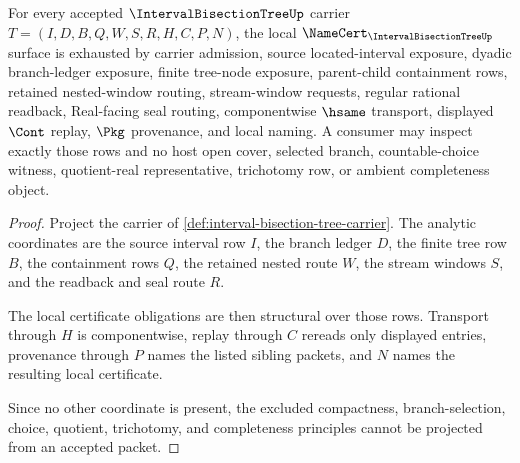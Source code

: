 \begin{theorem}
\label{thm:interval-bisection-tree-namecert-obligations}
For every accepted $\IntervalBisectionTreeUp$ carrier $T=(I,D,B,Q,W,S,R,H,C,P,N)$, the local $\NameCert_{\IntervalBisectionTreeUp}$ surface is exhausted by carrier admission, source located-interval exposure, dyadic branch-ledger exposure, finite tree-node exposure, parent-child containment rows, retained nested-window routing, stream-window requests, regular rational readback, Real-facing seal routing, componentwise $\hsame$ transport, displayed $\Cont$ replay, $\Pkg$ provenance, and local naming. A consumer may inspect exactly those rows and no host open cover, selected branch, countable-choice witness, quotient-real representative, trichotomy row, or ambient completeness object.
\end{theorem}
\begin{proof}
Project the carrier of \autoref{def:interval-bisection-tree-carrier}. The analytic coordinates are the source interval row $I$, the branch ledger $D$, the finite tree row $B$, the containment rows $Q$, the retained nested route $W$, the stream windows $S$, and the readback and seal route $R$.

The local certificate obligations are then structural over those rows. Transport through $H$ is componentwise, replay through $C$ rereads only displayed entries, provenance through $P$ names the listed sibling packets, and $N$ names the resulting local certificate.

Since no other coordinate is present, the excluded compactness, branch-selection, choice, quotient, trichotomy, and completeness principles cannot be projected from an accepted packet.
\end{proof}

